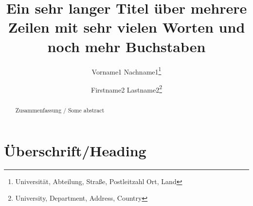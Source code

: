 \documentclass[]{lni}
\begin{document}
\title[Ein Kurztitel]{Ein sehr langer Titel über mehrere Zeilen mit sehr vielen
Worten und noch mehr Buchstaben}
\author[Vorname1 Nachname1 \and Firstname2 Lastname2]
{Vorname1 Nachname1\footnote{Universität, Abteilung, Straße, Postleitzahl Ort,
Land } \and
Firstname2 Lastname2\footnote{University, Department, Address, Country
}}
\maketitle

\begin{abstract}
Zusammenfassung / Some abstract
\end{abstract}
\section{Überschrift/Heading}

\end{document}
